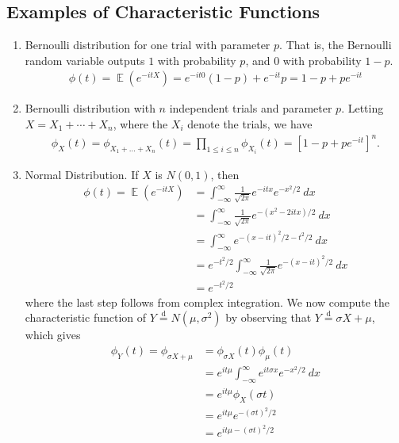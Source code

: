 \documentclass[12pt]{article}
\DeclareMathOperator{\ex}{\mathbb{E}}
\theoremstyle{plain}
\theoremstyle{definition}
\theoremstyle{remark}
\numberwithin{equation}{section}  %
\begin{document}
\subsection{Examples of Characteristic Functions}
\begin{enumerate}
	\item Bernoulli distribution for one trial with parameter $p$. That is,
		the Bernoulli random variable outputs $1$ with probability $p$,
		and $0$ with probability $1-p$.
		\begin{equation*}
			\begin{split}
				\phi(t) = \ex(e^{-itX}) = e^{-it0}(1-p) + e^{-it}p = 1-p + pe^{-it}
			\end{split}
		\end{equation*}
	\item Bernoulli distribution with $n$ independent trials and parameter
		$p$. Letting $X = X_{1} + \cdots + X_{n}$, where the $X_i$ denote
		the trials, we have
		\begin{equation*}
			\begin{split}
				\phi_{X}(t) = \phi_{X_{1} + \ldots + X_{n}}(t)
				 = \prod_{1 \le i \le n} \phi_{X_{i}}(t)
				 = \left[ 1-p + pe^{-it} \right]^{n}.
			\end{split}
		\end{equation*}
	\item Normal Distribution. If $X$ is $N(0,1)$, then
		\begin{equation*}
			\begin{split}
				\phi(t) = \ex(e^{-itX})
				& = \int_{-\infty}^{\infty} \frac{1}{\sqrt{2 \pi}} e^{-itx}
				e^{-x^{2}/2} \ dx
				\\
				& = \int_{-\infty}^{\infty}\frac{1}{\sqrt{2 \pi}} e^{-(x^{2} -2itx)/2} \
				dx
				\\
				& = \int_{-\infty}^{\infty} e^{-(x-it)^{2}/2 - t^{2}/2} \ dx
				\\
				& = e^{-t^{2}/2} \int_{-\infty}^{\infty} \frac{1}{\sqrt{2 \pi}}
				e^{-(x - it)^{2}/2} \ dx
				\\
				& = e^{-t^{2}/2}
			\end{split}
		\end{equation*}
		where the last step follows from complex integration.	
		We now compute the characteristic function of $Y \overset{\text{d}}{=}N(\mu,
		\sigma^{2})$ by observing that $Y \overset{\text{d}}{=} \sigma X + \mu$,
		which gives
		\begin{equation*}
			\begin{split}
				\phi_{Y}(t) = \phi_{\sigma X + \mu}
				& =  \phi_{\sigma X}(t) \phi_{\mu}(t)
				\\
				& = e^{it\mu} \int_{-\infty}^{\infty} e^{i t \sigma x} e^{-x^{2}/2} \ dx
				\\
				& = e^{it \mu} \phi_{X}(\sigma t)
				\\
				& = e^{it \mu} e^{-( \sigma t)^{2}/2}
				\\
				& = e^{it \mu - (\sigma t)^{2}/2}
			\end{split}
		\end{equation*}
\end{enumerate}
\end{document}
